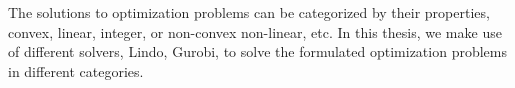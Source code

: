 The solutions to optimization problems can be categorized by their properties, \ie convex, linear, integer, or non-convex non-linear, etc.
In this thesis, we make use of different solvers, \ie Lindo, Gurobi, to solve the formulated optimization problems in different categories.


